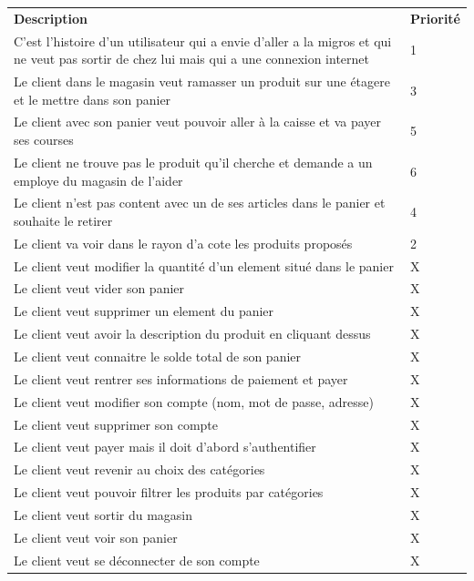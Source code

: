 \documentclass[12pt]{article}
\begin{document}
\begin{center}
    \begin{tabular}{ | L{13cm} || C{2cm} | }
        \hline
        \textbf{Description} & \textbf{Priorité}\\
        \hhline{|=||=|}
        C'est l'histoire d'un utilisateur qui a envie d'aller a la migros et qui ne veut pas sortir de chez lui mais qui a une connexion internet & 1\\
        \hline
        Le client dans le magasin veut ramasser un produit sur une étagere et le mettre dans son panier & 3\\
        \hline
        Le client avec son panier veut pouvoir aller à la caisse et va payer ses courses & 5\\
        \hline
        Le client ne trouve pas le produit qu'il cherche et demande a un employe du magasin de l'aider & 6\\
        \hline
        Le client n'est pas content avec un de ses articles dans le panier et souhaite le retirer & 4\\
        \hline
        Le client va voir dans le rayon d'a cote les produits proposés & 2\\
        \hline
        Le client veut modifier la quantité d'un element situé dans le panier & X\\
        \hline
        Le client veut vider son panier & X\\
        \hline
        Le client veut supprimer un element du panier & X\\
        \hline
        Le client veut avoir la description du produit en cliquant dessus & X\\
        \hline
        Le client veut connaitre le solde total de son panier & X\\
        \hline
        Le client veut rentrer ses informations de paiement et payer & X\\
        \hline
        Le client veut modifier son compte (nom, mot de passe, adresse) & X\\
        \hline
        Le client veut supprimer son compte & X\\
        \hline
        Le client veut payer mais il doit d'abord s'authentifier & X\\
        \hline
        Le client veut revenir au choix des catégories & X\\
        \hline
        Le client veut pouvoir filtrer les produits par catégories & X\\
        \hline
        Le client veut sortir du magasin & X\\
        \hline
        Le client veut voir son panier & X\\
        \hline
        Le client veut se déconnecter de son compte & X\\
        \hline
    \end{tabular}
\end{center}
\end{document}
